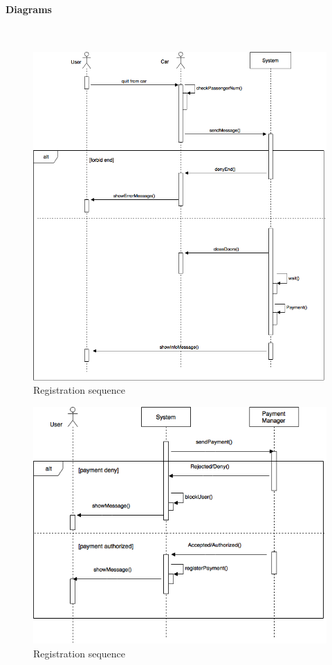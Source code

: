 \paragraph{Diagrams}\
\begin{figure}[H]
   \begin{center}
    \includegraphics[width=\textwidth]{Resources/endRent.png}
    \caption{Registration sequence}
   \end{center}
    \label{fig:endSequence}
\end{figure}
\begin{figure}[H]
   \begin{center}
    \includegraphics[width=\textwidth]{Resources/Payment.png}
    \caption{Registration sequence}
   \end{center}
    \label{fig:paymentSequence}
\end{figure}
